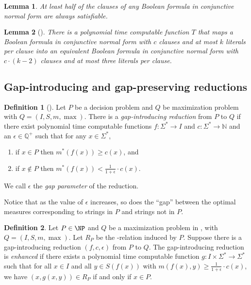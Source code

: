\documentclass[]{article}
\theoremstyle{plain}
\newtheorem{lemma}{Lemma}
\theoremstyle{definition}
\newtheorem{definition}{Definition}
\begin{document}
\begin{lemma}\label{lem:half}
 At least half of the clauses of any Boolean formula in conjunctive normal form are always satisfiable.
\end{lemma}

\begin{lemma}[{\cite[Example~6.5]{book}}]\label{lem:three}
  There is a polynomial time computable function $T$ that maps a Boolean formula in conjunctive normal form with $c$ clauses and at most $k$ literals per clause into an equivalent Boolean formula in conjunctive normal form with $c \cdot (k - 2)$ clauses and at most three literals per clause.
\end{lemma}

\subsection{Gap-introducing and gap-preserving reductions}\label{ssc:gaps}

\begin{definition}[{\cite[Section~29.1]{vazirani}}]\label{def:intro}
  Let $P$ be a decision problem and $Q$ be maximization problem with $Q = (I, S, m, \max)$.
  There is a \emph{gap-introducing reduction} from $P$ to $Q$ if there exist polynomial time computable functions $f \colon \Sigma^* \to I$ and $c \colon \Sigma^* \to \mathbb{N}$ and an $\epsilon \in \mathbb{Q}^+$ such that for any $x \in \Sigma^*$,
  \begin{enumerate}
  \item if $x \in P$ then $m^*(f(x)) \geq c(x)$, and
  \item if $x \notin P$ then $m^*(f(x)) < \frac{1}{1 + \epsilon} \cdot c(x)$.
  \end{enumerate}
  We call $\epsilon$ the \emph{gap parameter} of the reduction.
\end{definition}

Notice that as the value of $\epsilon$ increases, so does the ``gap'' between the optimal measures corresponding to strings in $P$ and strings not in $P$.

\begin{definition}
  Let $P\in\NP$ and $Q$ be a maximization problem in \NPO, with $Q = (I, S, m, \max)$.
  Let $R_P$ be the \NP-relation induced by $P$.
  Suppose there is a gap-introducing reduction $(f, c, \epsilon)$ from $P$ to $Q$.
  The gap-introducing reduction is \emph{enhanced} if there exists a polynomial time computable function $g \colon I \times \Sigma^* \to \Sigma^*$ such that for all $x \in I$ and all $y \in S(f(x))$ with $m(f(x), y) \geq \frac{1}{1 + \epsilon} \cdot c(x)$, we have $\left(x, g(x, y)\right) \in R_P$ if and only if $x \in P$.
\end{definition}
\end{document}
